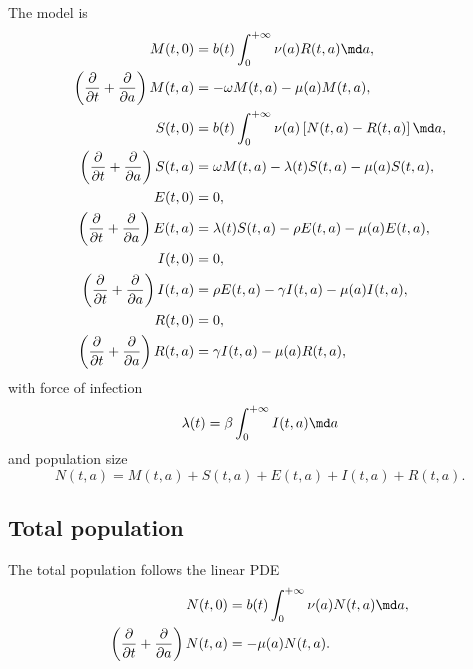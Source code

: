 \documentclass{jpmarticle}
\begin{document}
The model is
\begin{equation}
  \label{model_age_structured}
  \begin{split}
    M(t, 0)
    &= b(t) \int_0^{+\infty} \nu(a) R(t, a) \md a,
    \\
    \left(\frac{\partial}{\partial t}
      + \frac{\partial}{\partial a}\right)
    M(t, a)
    &= - \omega M(t, a) - \mu(a) M(t, a),
    \\
    S(t, 0)
    &= b(t) \int_0^{+\infty} \nu(a) \left[N(t, a) - R(t, a)\right] \md a,
    \\
    \left(\frac{\partial}{\partial t}
      + \frac{\partial}{\partial a}\right)
    S(t, a)
    &= \omega M(t, a) - \lambda(t) S(t, a) - \mu(a) S(t, a),
    \\
    E(t, 0)
    &= 0,
    \\
    \left(\frac{\partial}{\partial t}
      + \frac{\partial}{\partial a}\right)
    E(t, a)
    &= \lambda(t) S(t, a) - \rho E(t, a) - \mu(a) E(t, a),
    \\
    I(t, 0)
    &= 0,
    \\
    \left(\frac{\partial}{\partial t}
      + \frac{\partial}{\partial a}\right)
    I(t, a)
    &= \rho E(t, a) - \gamma I(t, a) - \mu(a) I(t, a),
    \\
    R(t, 0)
    &= 0,
    \\
    \left(\frac{\partial}{\partial t}
      + \frac{\partial}{\partial a}\right)
    R(t, a)
    &= \gamma I(t, a) - \mu(a) R(t, a),
  \end{split}
\end{equation}
with force of infection
\begin{equation}
  \lambda(t) = \beta \int_0^{+\infty} I(t, a) \md a
\end{equation}
and population size
\begin{equation}
  N(t, a) = M(t, a) + S(t, a) + E(t, a) + I(t, a) + R(t, a).
\end{equation}


\subsection{Total population}

The total population follows the linear PDE
\begin{equation}
  \begin{split}
    N(t, 0)
    &= b(t) \int_0^{+\infty} \nu(a) N(t, a) \md a,
    \\
    \left(\frac{\partial}{\partial t}
      + \frac{\partial}{\partial a}\right)
    N(t, a)
    &= - \mu(a) N(t, a).
  \end{split}
\end{equation}
\end{document}
